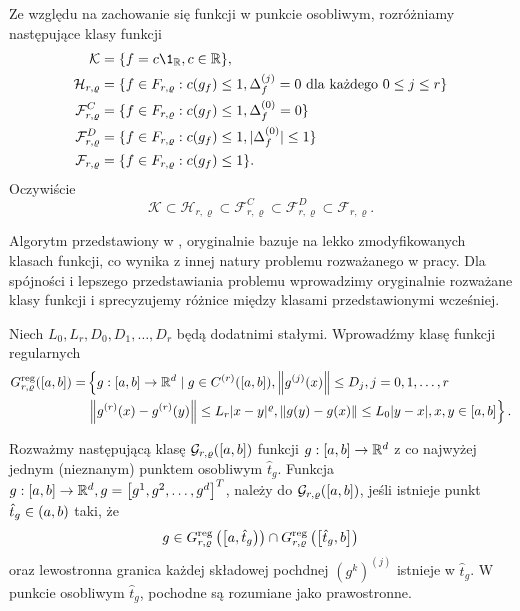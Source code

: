 \documentclass[oik, pdftex, man]{mgrwms}
\begin{document}
    Ze względu na zachowanie się funkcji w punkcie osobliwym, rozróżniamy następujące klasy funkcji
    \begin{equation*}
        \begin{split}
            \mathcal{K} & = \{f = c \1_{\R}, c \in \R \}, \\
            \mathcal{H}_{r, \varrho} & = \{ f \in F_{r, \varrho}: c(g_{f}) \leq 1, \Delta_{f}^{(j)} = 0 \text{ dla każdego } 0 \leq j \leq r\} \\
            \mathcal{F}_{r, \varrho}^{C} & = \{ f \in F_{r, \varrho}: c(g_{f}) \leq 1, \Delta_{f}^{(0)} = 0 \} \\
            \mathcal{F}_{r, \varrho}^{D} & = \{ f \in F_{r, \varrho}: c(g_{f}) \leq 1, | \Delta_{f}^{(0)} | \leq 1 \} \\
            \mathcal{F}_{r, \varrho} & = \{ f \in F_{r, \varrho}: c(g_{f}) \leq 1 \}. \\
        \end{split}
    \end{equation*}
    Oczywiście
    \begin{equation*}
        \mathcal{K} \subset \mathcal{H}_{r, \varrho} \subset \mathcal{F}_{r, \varrho}^{C} \subset \mathcal{F}_{r, \varrho}^{D} \subset \mathcal{F}_{r, \varrho}.
    \end{equation*}


    Algorytm przedstawiony w  \cite{CoDF}, oryginalnie bazuje na lekko zmodyfikowanych klasach funkcji, co wynika z innej natury problemu rozważanego w pracy. Dla spójności i lepszego przedstawiania problemu wprowadzimy oryginalnie rozważane klasy funkcji i sprecyzujemy różnice między klasami przedstawionymi wcześniej.

    Niech $L_{0}, L_{r}, D_{0}, D_{1}, \ldots, D_{r}$ będą dodatnimi stałymi. Wprowadźmy klasę funkcji regularnych
    \begin{equation*}
        \begin{aligned}
        G_{r, \varrho}^{\mathrm{reg}}([a, b])= &\left\{g:[a, b] \rightarrow \mathbb{R}^{d} \mid g \in C^{(r)}([a, b]),\left\|g^{(j)}(x)\right\| \leq D_{j}, j=0,1, \ldots, r\right. \\
                                      &\left.\left\|g^{(r)}(x)-g^{(r)}(y)\right\| \leq L_{r}|x-y|^{\varrho},\|g(y)-g(x)\| \leq L_{0}|y-x|, x,y \in [a, b]\right\}.
        \end{aligned}
    \end{equation*}

    Rozważmy następującą klasę $\mathcal{G}_{r,\varrho}([a, b])$ funkcji $g:[a, b] \rightarrow \mathbb{R}^{d}$ z co najwyżej jednym (nieznanym) punktem osobliwym $\hat{t}_{g}$. Funkcja $g:[a, b] \rightarrow \mathbb{R}^{d}, g=\left[g^{1}, g^{2}, \ldots, g^{d}\right]^{T}$, należy do $\mathcal{G}_{r,\varrho}([a, b])$, jeśli istnieje punkt $\hat{t}_{g} \in (a, b)$ taki, że 
    \begin{equation*}
        g \in G_{r, \varrho}^{\mathrm{reg}}\left(\left[a, \hat{t}_{g}\right)\right) \cap G_{r, \varrho}^{\mathrm{reg}}\left(\left[\hat{t}_{g}, b\right]\right)    
    \end{equation*}
    oraz lewostronna granica każdej składowej pochdnej $\left(g^{k}\right)^{(j)}$ istnieje w $\hat{t}_{g}$. W punkcie osobliwym $\hat{t}_{g}$, pochodne są rozumiane jako prawostronne.
    
\end{document}
